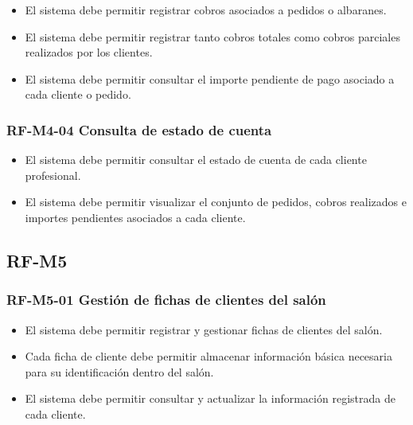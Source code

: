 \begin{itemize}
    \item El sistema debe permitir registrar cobros asociados a pedidos o albaranes.
    \item El sistema debe permitir registrar tanto cobros totales como cobros parciales realizados por los clientes.
    \item El sistema debe permitir consultar el importe pendiente de pago asociado a cada cliente o pedido.
\end{itemize}

\vspace{-0.75em}
\subsubsection{RF-M4-04 Consulta de estado de cuenta}
\vspace{-1em}

\begin{itemize}
    \item El sistema debe permitir consultar el estado de cuenta de cada cliente profesional.
    \item El sistema debe permitir visualizar el conjunto de pedidos, cobros realizados e importes pendientes asociados a cada cliente.
\end{itemize}

\subsection{RF-M5}

\vspace{-0.75em}
\subsubsection{RF-M5-01 Gestión de fichas de clientes del salón}
\vspace{-1em}

\begin{itemize}
    \item El sistema debe permitir registrar y gestionar fichas de clientes del salón.
    \item Cada ficha de cliente debe permitir almacenar información básica necesaria para su identificación dentro del salón.
    \item El sistema debe permitir consultar y actualizar la información registrada de cada cliente.
\end{itemize}

